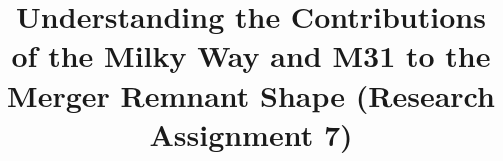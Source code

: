 \documentclass[linenumbers,trackchanges,twocolumn]{aastex7}
\begin{document}
\title{Understanding the Contributions of the Milky Way and M31 to the Merger Remnant Shape (Research Assignment 7)}

\end{document}
